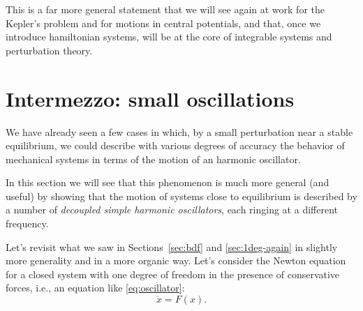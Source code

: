 \documentclass[english,fontsize=11pt,paper=a5,oneside]{scrbook}
\theoremstyle{definition}
\begin{document}
This is a far more general statement that we will see again at work for the Kepler's problem and for motions in central potentials, and that, once we introduce hamiltonian systems, will be at the core of integrable systems and perturbation theory.


\section{Intermezzo: small oscillations}\label{sec:soc}
We have already seen a few cases in which, by a small perturbation near a stable equilibrium, we could describe with various degrees of accuracy the behavior of mechanical systems in terms of the motion of an harmonic oscillator.

In this section we will see that this phenomenon is much more general (and useful) by showing that the motion of systems close to equilibrium is described by a number of \emph{decoupled simple harmonic oscillators}, each ringing at a different frequency.

Let's revisit what we saw in Sections~\ref{sec:bdf} and \ref{sec:1deg-again} in slightly more generality and in a more organic way. Let's consider the Newton equation for a closed system with one degree of freedom in the presence of conservative forces, i.e., an equation like \eqref{eq:oscillator}:
\begin{equation}
  \ddot x = F(x).
\end{equation}
\end{document}
